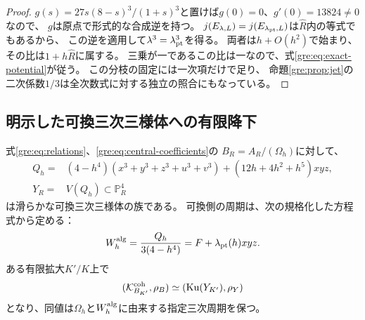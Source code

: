 \begin{proof}
$g(s)=27s(8-s)^3/(1+s)^3$と置けば$g(0)=0$、$g'(0)=13824\ne0$なので、
$g$は原点で形式的な合成逆を持つ。
$j(E_{\lambda,L})=j(E_{\lambda_{\rm pt},L})$は$\widehat R$内の等式でもあるから、
この逆を適用して$\lambda^3=\lambda_{\rm pt}^3$を得る。
両者は$h+O(h^2)$で始まり、その比は$1+h\widehat R$に属する。
三乗が一であるこの比は一なので、式\eqref{gre:eq:exact-potential}が従う。
この分枝の固定には一次項だけで足り、
命題\ref{gre:prop:jet}の二次係数$1/3$は全次数式に対する独立の照合にもなっている。
\end{proof}

\subsection{明示した可換三次三様体への有限降下}
\begin{corollary}[固定された有理方程式への一般点復元]
\label{gre:cor:rational-model}
式\eqref{gre:eq:relations}、\eqref{gre:eq:central-coefficients}の
$B_R=A_R/(\Omega_h)$に対して、
\begin{equation}\label{gre:eq:rational-model}
 \begin{aligned}
 Q_h={}&(4-h^4)(x^3+y^3+z^3+u^3+v^3)
       +(12h+4h^2+h^5)xyz,\\
 Y_R={}&V(Q_h)\subset\mathbb P^4_R
 \end{aligned}
\end{equation}
は滑らかな可換三次三様体の族である。
可換側の周期は、次の規格化した方程式から定める：
\begin{equation}\label{gre:eq:normalized-rational-model}
 W_h^{\rm alg}=\frac{Q_h}{3(4-h^4)}=F+\lambda_{\rm pt}(h)xyz.
\end{equation}
ある有限拡大$K'/K$上で
\begin{equation}\label{gre:eq:explicit-generic-equivalence}
 (\mathcal K^{\rm coh}_{B_{K'}},\rho_B)
 \simeq(\operatorname{Ku}(Y_{K'}),\rho_Y)
\end{equation}
となり、同値は$\Omega_h$と$W_h^{\rm alg}$に由来する指定三次周期を保つ。
\end{corollary}
